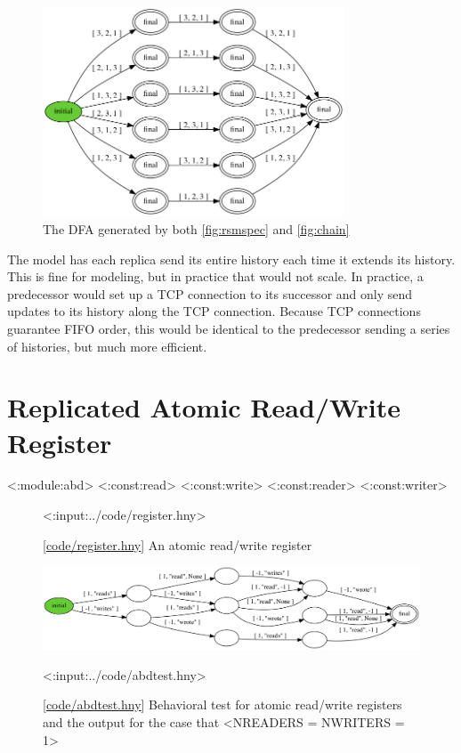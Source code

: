 \documentclass{report}
\newcommand{\harmonylink}[1]{%
[\href{https://harmony.cs.cornell.edu/#1}{\underline{#1}}]%
}
\newenvironment{code}{
\tcolorbox
}{
\endtcolorbox
}
\begin{document}
\begin{figure}
\begin{center}
\includegraphics[width=0.8\textwidth]{figures/rsmspec.png}
\end{center}
\caption{The DFA generated by both
\autoref{fig:rsmspec} and \autoref{fig:chain}}
\label{fig:rsmdfa}
\end{figure}

The model has each replica send its entire history each time it extends
its history.  This is fine for modeling, but in practice that would not
scale.  In practice, a predecessor would set up a TCP connection to
its successor and only send updates to its history along the TCP
connection.  Because TCP connections guarantee FIFO order, this would
be identical to the predecessor sending a series of histories, but
much more efficient.

\chapter{Replicated Atomic Read/Write Register}
\label{ch:abd}

<{:module:abd}>
<{:const:read}>
<{:const:write}>
<{:const:reader}>
<{:const:writer}>

\begin{figure}
\begin{code}
<{:input:../code/register.hny}>
\end{code}
\caption{\harmonylink{code/register.hny} An atomic read/write register}
\label{fig:register}
\end{figure}

\begin{figure}
\begin{center}
\includegraphics[width=\textwidth]{figures/abdtest.png}
\end{center}
\begin{code}
<{:input:../code/abdtest.hny}>
\end{code}
\caption{\harmonylink{code/abdtest.hny} Behavioral test for atomic read/write registers and the output for the case that <{NREADERS = NWRITERS = 1}>}
\label{fig:abdtest}
\end{figure}
\end{document}
